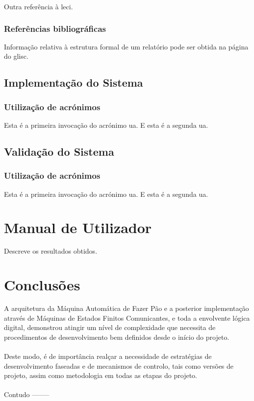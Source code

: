\documentclass{report}
\begin{document}
Outra referência à \ac{leci}.

\subsection{Referências bibliográficas}
Informação relativa à estrutura formal de um relatório pode ser obtida
na página do \ac{glisc}\cite{glisc}.

\section{Implementação do Sistema}

\subsection{Utilização de acrónimos}
Esta é a primeira invocação do acrónimo \ac{ua}.
E esta é a segunda \ac{ua}.

\section{Validação do Sistema}

\subsection{Utilização de acrónimos}
Esta é a primeira invocação do acrónimo \ac{ua}.
E esta é a segunda \ac{ua}.

\chapter{Manual de Utilizador}
\label{chap.manualUtilizador}
Descreve os resultados obtidos.

\chapter{Conclusões}
\label{chap.conclusao}
A arquitetura da Máquina Automática de Fazer Pão e a posterior implementação através de Máquinas de Estados Finitos Comunicantes, e toda a envolvente lógica digital, demonstrou atingir um nível de complexidade que necessita de procedimentos de desenvolvimento bem definidos desde o início do projeto.
\\\\
Deste modo, é de importância realçar a necessidade de estratégias de desenvolvimento faseadas e de mecanismos de controlo, tais como versões de projeto, assim como metodologia em todas as etapas do projeto.
\\\\
Contudo --------
\end{document}
